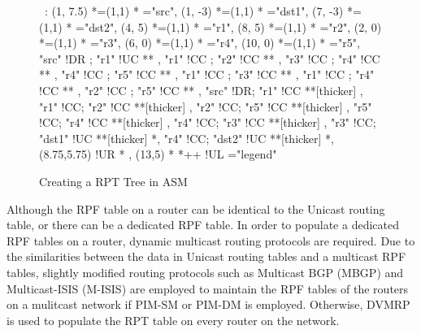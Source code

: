 \begin{figure}[Hp]
\label{fig:asm-rpt}

\begin{center}

\ \xy<1cm,0cm>:
(1, 7.5)  *=(1,1) 	  	*\frm{-}  ="src",
(1, -3)   *=(1,1) 	*\frm{-}  ="dst1",
(7, -3)   *=(1,1) 	*\frm{-}  ="dst2",
%
(4,  5)   *=(1,1)  *   ="r1",
(8,  5)   *=(1,1)  *   ="r2",
(2,  0)   *=(1,1)  *   ="r3",
(6,  0)   *=(1,1)  *   ="r4",
(10, 0)   *=(1,1)  *   ="r5",
%
"src" !DR ; "r1" !UC **\dir{~} ,
%
"r1" !CC ; "r2" !CC **\dir{~} ,
"r3" !CC ; "r4" !CC **\dir{~} ,
"r4" !CC ; "r5" !CC **\dir{~} ,
"r1" !CC ; "r3" !CC **\dir{~} ,
"r1" !CC ; "r4" !CC **\dir{~} ,
"r2" !CC ; "r5" !CC **\dir{~} ,
%
"src" !DR; "r1"   !CC **[thicker]\dir{=} ,
"r1"  !CC; "r2"   !CC **[thicker]\dir{=} ,
"r2"  !CC; "r5"   !CC **[thicker]\dir{=} ,
"r5"  !CC; "r4"   !CC **[thicker]\dir{=} ,
"r4"  !CC; "r3"   !CC **[thicker]\dir{=} ,
"r3"  !CC; "dst1" !UC **[thicker]\dir{=} *,
"r4"  !CC; "dst2" !UC **[thicker]\dir{=} *,
%
\POS (8.75,5.75) !UR * ,
%
\POS (13,5) * *++\frm{-} !UL ="legend"
\endxy

\end{center}

\caption{Creating a RPT Tree in ASM}

\end{figure}

Although the RPF table on a router can be identical to the Unicast
routing table, or there can be a dedicated RPF table. In order to 
populate a dedicated RPF tables on a router, dynamic multicast 
routing protocols are required. Due to the similarities between the data
in Unicast routing tables and a multicast RPF tables, slightly modified
routing protocols such as Multicast BGP (MBGP) and Multicast-ISIS
(M-ISIS) are employed to maintain the RPF tables of the routers on a
mulitcast network if PIM-SM or PIM-DM is employed. Otherwise, DVMRP is
used to populate the RPT table on every router on the network.


